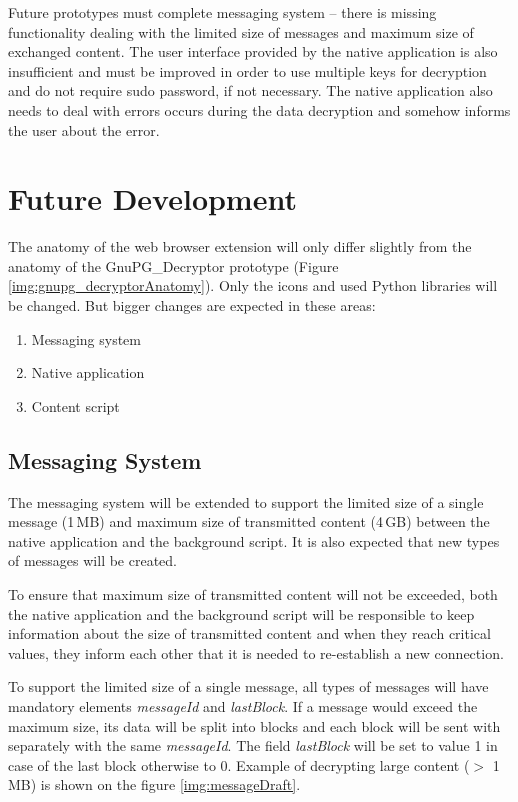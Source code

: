Future prototypes must complete messaging system -- there is missing functionality dealing with the limited size of messages and maximum size of exchanged content. The user interface provided by the native application is also insufficient and must be improved in order to use multiple keys for decryption and do not require sudo password, if not necessary. The native application also needs to deal with errors occurs during the data decryption and somehow informs the user about the error.

\section{Future Development}
The anatomy of the web browser extension will only differ slightly from the anatomy of the GnuPG\_Decryptor prototype (Figure \ref{img:gnupg_decryptorAnatomy}). Only the icons and used Python libraries will be changed. But bigger changes are expected in these areas:
\begin{enumerate}
    \item Messaging system
    \item Native application
    \item Content script
\end{enumerate}

\subsection{Messaging System}
The messaging system will be extended to support the limited size of a single message (1\,MB) and maximum size of transmitted content (4\,GB) between the native application and the background script. It is also expected that new types of messages will be created.

To ensure that maximum size of transmitted content will not be exceeded, both the native application and the background script will be responsible to keep information about the size of transmitted content and when they reach critical values, they inform each other that it is needed to re-establish a new connection.

To support the limited size of a single message, all types of messages will have mandatory elements \textit{messageId} and \textit{lastBlock}. If a message would exceed the maximum size, its data will be split into blocks and each block will be sent with separately with the same \textit{messageId}. The field \textit{lastBlock} will be set to value 1 in case of the last block otherwise to 0. Example of decrypting large content ($>$ 1\,MB) is shown on the figure \ref{img:messageDraft}.

